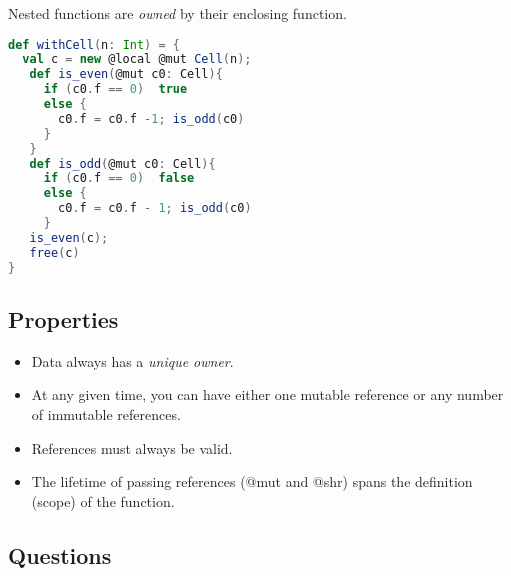 Nested functions are \emph{owned} by their enclosing function.
\begin{lstlisting}[language=Scala,basicstyle=\footnotesize\ttfamily]
def withCell(n: Int) = {
  val c = new @local @mut Cell(n);
   def is_even(@mut c0: Cell){
     if (c0.f == 0)  true
     else {
       c0.f = c0.f -1; is_odd(c0) 
     }
   }
   def is_odd(@mut c0: Cell){
     if (c0.f == 0)  false
     else {
       c0.f = c0.f - 1; is_odd(c0)
     }
   is_even(c);  
   free(c)
}
\end{lstlisting}



\clearpage
\subsection{Properties}
\begin{itemize}
\item Data always has a \emph{unique owner}.
\item At any given time, you can have either one mutable reference or any number of immutable references.
\item References must always be valid.
\item The lifetime of passing references (@mut and @shr) spans the definition (scope) of the function.
\end{itemize}

\subsection{Questions}
%
%

%







 


